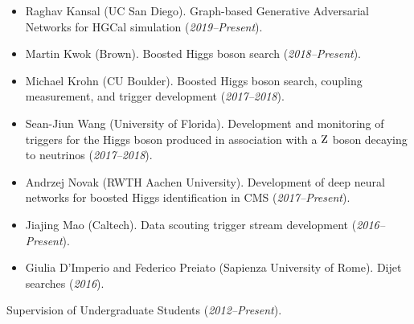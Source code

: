 \documentclass[11pt]{res}
\begin{document}
\begin{resume}
\begin{itemize}
\item Raghav Kansal (UC San Diego). Graph-based Generative Adversarial
  Networks for HGCal simulation (\textit{2019--Present}).
\item Martin Kwok (Brown). Boosted Higgs boson search (\textit{2018--Present}).
\item Michael Krohn (CU Boulder). Boosted Higgs boson search, coupling
  measurement, and trigger development (\textit{2017--2018}).
\item Sean-Jiun Wang (University of Florida). Development and
  monitoring of triggers for the Higgs boson produced in association with a
  $\mathrm{Z}$ boson decaying to neutrinos (\textit{2017--2018}).
\item Andrzej Novak (RWTH Aachen University). Development of deep neural
  networks for boosted Higgs identification in CMS (\textit{2017--Present}).
\item Jiajing Mao (Caltech). Data scouting trigger stream development (\textit{2016--Present}).
\item Giulia D'Imperio and Federico Preiato (Sapienza University of Rome). Dijet searches (\textit{2016}).
\end{itemize}

Supervision of Undergraduate Students (\textit{2012--Present}).


\end{resume}
\end{document}
